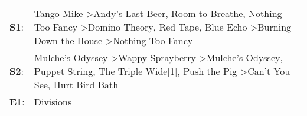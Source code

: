 \begin{supertabular}{p{0.03\textwidth}p{0.92\textwidth}}
 \textbf{S1}:  &  Tango Mike\textsuperscript{} \textgreater \enspace Andy's Last Beer\textsuperscript{}, \enspace Room to Breathe\textsuperscript{}, \enspace Nothing Too Fancy\textsuperscript{} \textgreater \enspace Domino Theory\textsuperscript{}, \enspace Red Tape\textsuperscript{}, \enspace Blue Echo\textsuperscript{} \textgreater \enspace Burning Down the House\textsuperscript{} \textgreater \enspace Nothing Too Fancy\textsuperscript{}  \enspace  \\
 \textbf{S2}:  &                                                    Mulche's Odyssey\textsuperscript{} \textgreater \enspace Wappy Sprayberry\textsuperscript{} \textgreater \enspace Mulche's Odyssey\textsuperscript{}, \enspace Puppet String\textsuperscript{}, \enspace The Triple Wide[1]\textsuperscript{}, \enspace Push the Pig\textsuperscript{} \textgreater \enspace Can't You See\textsuperscript{}, \enspace Hurt Bird Bath\textsuperscript{}  \enspace  \\
 \textbf{E1}:  &                                                                                                                                                                                                                                                                                                                                                                                                                Divisions\textsuperscript{}  \enspace  \\
\end{supertabular}
